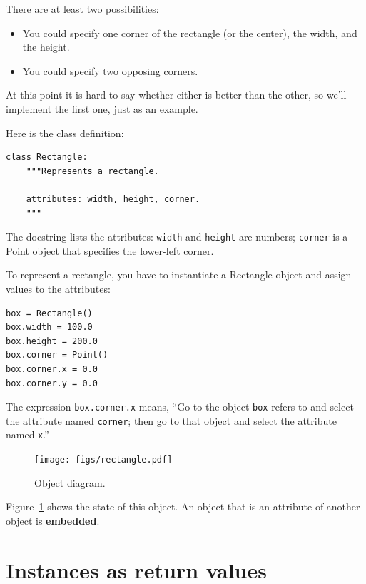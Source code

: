 \documentclass[10pt]{book}
\begin{document}
There are at least two possibilities:

\begin{itemize}

\item You could specify one corner of the rectangle
(or the center), the width, and the height.

\item You could specify two opposing corners.

\end{itemize}

At this point it is hard to say whether either is better than
the other, so we'll implement the first one, just as an example.

Here is the class definition:

\begin{verbatim}
class Rectangle:
    """Represents a rectangle.

    attributes: width, height, corner.
    """
\end{verbatim}
%
The docstring lists the attributes:  {\tt width} and
{\tt height} are numbers; {\tt corner} is a Point object that
specifies the lower-left corner.

To represent a rectangle, you have to instantiate a Rectangle
object and assign values to the attributes:

\begin{verbatim}
box = Rectangle()
box.width = 100.0
box.height = 200.0
box.corner = Point()
box.corner.x = 0.0
box.corner.y = 0.0
\end{verbatim}
%
The expression {\tt box.corner.x} means,
``Go to the object {\tt box} refers to and select the attribute named
{\tt corner}; then go to that object and select the attribute named
{\tt x}.''

\begin{figure}
\centerline
{\texttt{[image: figs/rectangle.pdf]}}
\caption{Object diagram.}
\label{fig.rectangle}
\end{figure}


Figure~\ref{fig.rectangle} shows the state of this object.
An object that is an attribute of another object is {\bf embedded}.


\section{Instances as return values}
\end{document}
